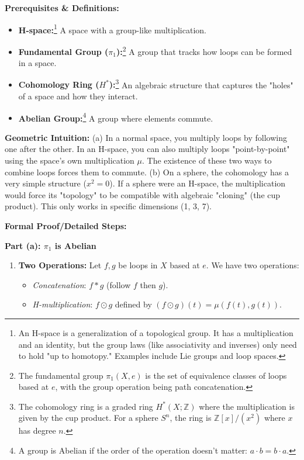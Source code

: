\begin{solution}
\textbf{Prerequisites \& Definitions:}
\begin{itemize}
    \item \textbf{H-space:}\footnote{An H-space is a generalization of a topological group. It has a multiplication and an identity, but the group laws (like associativity and inverses) only need to hold "up to homotopy." Examples include Lie groups and loop spaces.} A space with a group-like multiplication.
    \item \textbf{Fundamental Group ($\pi_1$):}\footnote{The fundamental group $\pi_1(X, e)$ is the set of equivalence classes of loops based at $e$, with the group operation being path concatenation.} A group that tracks how loops can be formed in a space.
    \item \textbf{Cohomology Ring ($H^*$):}\footnote{The cohomology ring is a graded ring $H^*(X; \mathbb{Z})$ where the multiplication is given by the cup product. For a sphere $S^n$, the ring is $\mathbb{Z}[x]/(x^2)$ where $x$ has degree $n$.} An algebraic structure that captures the "holes" of a space and how they interact.
    \item \textbf{Abelian Group:}\footnote{A group is Abelian if the order of the operation doesn't matter: $a \cdot b = b \cdot a$.} A group where elements commute.
\end{itemize}

\textbf{Geometric Intuition:}
(a) In a normal space, you multiply loops by following one after the other. In an H-space, you can also multiply loops "point-by-point" using the space's own multiplication $\mu$. The existence of these two ways to combine loops forces them to commute.
(b) On a sphere, the cohomology has a very simple structure ($x^2=0$). If a sphere were an H-space, the multiplication would force its "topology" to be compatible with algebraic "cloning" (the cup product). This only works in specific dimensions (1, 3, 7).

\textbf{Formal Proof/Detailed Steps:}

\textbf{Part (a): $\pi_1$ is Abelian}
\begin{enumerate}
    \item \textbf{Two Operations:}
    Let $f, g$ be loops in $X$ based at $e$. We have two operations:
    \begin{itemize}
        \item \textit{Concatenation}: $f * g$ (follow $f$ then $g$).
        \item \textit{H-multiplication}: $f \odot g$ defined by $(f \odot g)(t) = \mu(f(t), g(t))$.
    \end{itemize}
    

\end{enumerate}
\end{solution}
